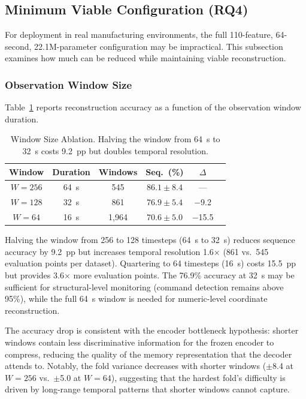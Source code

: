 \documentclass[sensors,article,submit,moreauthors,pdftex]{Definitions/mdpi}
\begin{document}
\subsection{Minimum Viable Configuration (RQ4)}
\label{sec:rq4_minimum}

For deployment in real manufacturing environments, the full 110-feature, 64-second, 22.1M-parameter configuration may be impractical. This subsection examines how much can be reduced while maintaining viable reconstruction.

\subsubsection{Observation Window Size}
\label{sec:window_ablation}

Table~\ref{tab:window} reports reconstruction accuracy as a function of the observation window duration.

\begin{table}[htbp]
\centering
\caption{Window Size Ablation. Halving the window from 64~s to 32~s costs 9.2~pp but doubles temporal resolution.}
\label{tab:window}
\small
\begin{tabular}{@{}cccccc@{}}
\toprule
\textbf{Window} & \textbf{Duration} & \textbf{Windows} & \textbf{Seq.\ (\%)} & \textbf{$\Delta$} \\
\midrule
$W{=}256$ & 64~s  & 545   & $86.1 \pm 8.4$  & --- \\
$W{=}128$ & 32~s  & 861   & $76.9 \pm 5.4$  & $-$9.2 \\
$W{=}64$  & 16~s  & 1{,}964 & $70.6 \pm 5.0$  & $-$15.5 \\
\bottomrule
\end{tabular}
\normalsize
\end{table}

Halving the window from 256 to 128 timesteps (64~s to 32~s) reduces sequence accuracy by 9.2~pp but increases temporal resolution 1.6$\times$ (861 vs.\ 545 evaluation points per dataset). Quartering to 64 timesteps (16~s) costs 15.5~pp but provides 3.6$\times$ more evaluation points. The 76.9\% accuracy at 32~s may be sufficient for structural-level monitoring (command detection remains above 95\%), while the full 64~s window is needed for numeric-level coordinate reconstruction.

The accuracy drop is consistent with the encoder bottleneck hypothesis: shorter windows contain less discriminative information for the frozen encoder to compress, reducing the quality of the memory representation that the decoder attends to. Notably, the fold variance decreases with shorter windows ($\pm$8.4 at $W{=}256$ vs.\ $\pm$5.0 at $W{=}64$), suggesting that the hardest fold's difficulty is driven by long-range temporal patterns that shorter windows cannot capture.
\end{document}
